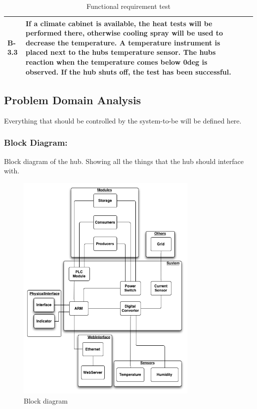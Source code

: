 \begin{table}[H]
\begin{tabular} [b] {| p{1.2cm} |  p{9.3cm} | p{1.2cm} | p{3.8cm} |}
		B-3.3	& If a climate cabinet is available, the heat tests will be performed there, otherwise cooling spray will be used to decrease the temperature. A temperature instrument is placed next to the hubs temperature sensor. The hubs reaction when the temperature comes below 0deg is observed. If the hub shuts off, the test has been successful.	&	&\\ \hline
	\end{tabular}
	\caption{Functional requirement test}
\end{table}


\newpage
\subsection{Problem Domain Analysis}
Everything that should be controlled by the system-to-be will be defined here. 
\subsubsection{Block Diagram:}
Block diagram of the hub. Showing all the things that the hub should interface with.
	\begin{figure}[H]
		\begin{centering}
			 \includegraphics[width=0.78\textwidth]{images/block_diagram.png}
			\caption{Block diagram}
	 	\end{centering}
	\end{figure}

